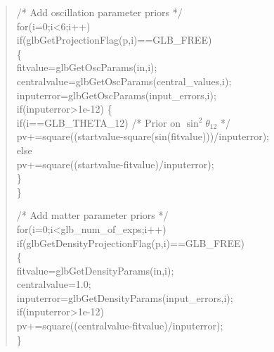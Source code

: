 {\begin{quote}
{{ \hspace*{0.5cm} /* Add oscillation parameter priors */ \\
  \hspace*{0.5cm}  for(i=0;i<6;i++) \\
  \hspace*{0.5cm} if(glbGetProjectionFlag(p,i)==GLB\_FREE) \\
  \hspace*{0.5cm} \{ \\
  \hspace*{1cm} fitvalue=glbGetOscParams(in,i); \\
  \hspace*{1cm} centralvalue=glbGetOscParams(central\_values,i); \\
  \hspace*{1cm} inputerror=glbGetOscParams(input\_errors,i); \\
  \hspace*{1cm} if(inputerror>1e-12) 
  \hspace*{1cm} \{ \\
  \hspace*{1.5cm} if(i==GLB\_THETA\_12) /* Prior on $\sin^2 \theta_{12}$ */ \\ 
\hspace*{2.0cm} pv+=square((startvalue-square(sin(fitvalue)))/inputerror);\\ 
  \hspace*{1.5cm} else \\ 
  \hspace*{2.0cm}  pv+=square((startvalue-fitvalue)/inputerror); \\
  \hspace*{1cm} \} \\
  \hspace*{0.5cm} \} 

\hspace*{0.5cm} /* Add matter parameter priors */ \\
  \hspace*{0.5cm} for(i=0;i<glb\_num\_of\_exps;i++) \\
  \hspace*{0.5cm} if(glbGetDensityProjectionFlag(p,i)==GLB\_FREE) \\
  \hspace*{0.5cm} \{ \\
  \hspace*{1cm}  fitvalue=glbGetDensityParams(in,i); \\
  \hspace*{1cm}  centralvalue=1.0; \\
  \hspace*{1cm}  inputerror=glbGetDensityParams(input\_errors,i); \\
  \hspace*{1cm}  if(inputerror>1e-12) \\
  \hspace*{1.5cm}   pv+=square((centralvalue-fitvalue)/inputerror); \\
  \hspace*{0.5cm} \} 

}}
\end{quote}}
